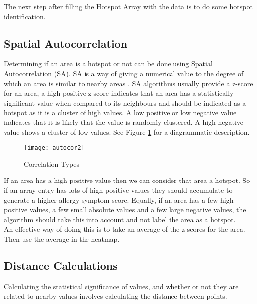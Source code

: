 The next step after filling the Hotspot Array with the data is to do some hotspot identification.

\subsection{Spatial Autocorrelation}

Determining if an area is a hotspot or not can be done using Spatial Autocorrelation (SA). SA is a way of giving a numerical value to the degree of which an area is similar to nearby areas \cite{autocor}. SA algorithms usually provide a z-score for an area, a high positive z-score indicates that an area has a statistically significant value when compared to its neighbours and should be indicated as a hotspot as it is a cluster of high values. A low positive or low negative value indicates that it is likely that the value is randomly clustered. A high negative value shows a cluster of low values. See Figure \ref{fig:autocor2} for a diagrammatic description.\\

\begin{figure}[H]
\begin{center}
\texttt{[image: autocor2]}
\caption{Correlation Types \cite{ytcorr}}
\label{fig:autocor2}
\end{center}
\end{figure}

If an area has a high positive value then we can consider that area a hotspot. So if an array entry has lots of high positive values they should accumulate to generate a higher allergy symptom score. Equally, if an area has a few high positive values, a few small absolute values and a few large negative values, the algorithm should take this into account and not label the area as a hotspot.\\

An effective way of doing this is to take an average of the z-scores for the area. Then use the average in the heatmap.

\subsection{Distance Calculations}

Calculating the statistical significance of values, and whether or not they are related to nearby values involves calculating the distance between points.\\

